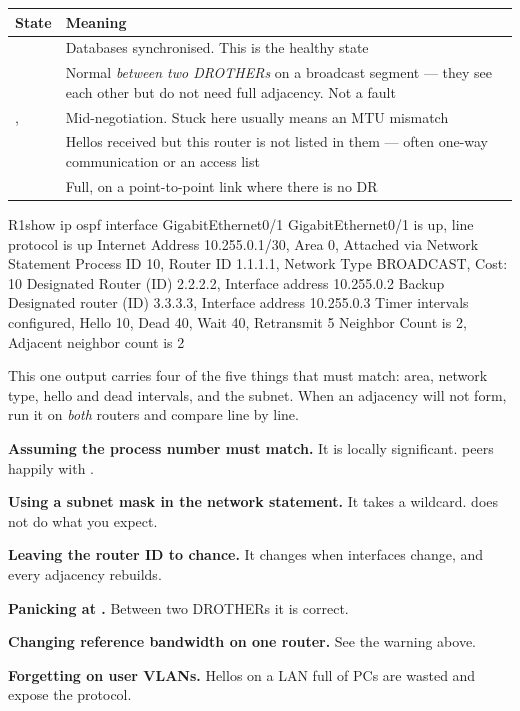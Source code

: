 \begin{longtable}{@{}L{3.4cm}L{11.8cm}@{}}
\toprule
{}
\textbf{State} & \textbf{Meaning} \\
\midrule
\endhead
{} & Databases synchronised. This is the healthy state \\
 & Normal \emph{between two DROTHERs} on a broadcast segment --- they
see each other but do not need full adjacency. Not a fault \\
,  & Mid-negotiation. Stuck here usually means an MTU
mismatch \\
 & Hellos received but this router is not listed in them --- often
one-way communication or an access list \\
 & Full, on a point-to-point link where there is no DR \\
\bottomrule
\end{longtable}

\begin{verify}{R1}{show ip ospf interface GigabitEthernet0/1}
GigabitEthernet0/1 is up, line protocol is up
  Internet Address 10.255.0.1/30, Area 0, Attached via Network Statement
  Process ID 10, Router ID 1.1.1.1, Network Type BROADCAST, Cost: 10
  Designated Router (ID) 2.2.2.2, Interface address 10.255.0.2
  Backup Designated router (ID) 3.3.3.3, Interface address 10.255.0.3
  Timer intervals configured, Hello 10, Dead 40, Wait 40, Retransmit 5
  Neighbor Count is 2, Adjacent neighbor count is 2
\end{verify}

This one output carries four of the five things that must match: area, network
type, hello and dead intervals, and the subnet. When an adjacency will not form,
run it on \emph{both} routers and compare line by line.

\begin{pitfall}
\begin{tight}
  \item \textbf{Assuming the process number must match.} It is locally
        significant.  peers happily with .
  \item \textbf{Using a subnet mask in the network statement.} It takes a
        wildcard.  does not do what you
        expect.
  \item \textbf{Leaving the router ID to chance.} It changes when interfaces
        change, and every adjacency rebuilds.
  \item \textbf{Panicking at .} Between two DROTHERs it is correct.
  \item \textbf{Changing reference bandwidth on one router.} See the warning
        above.
  \item \textbf{Forgetting  on user VLANs.} Hellos on a
        LAN full of PCs are wasted and expose the protocol.
\end{tight}
\end{pitfall}

